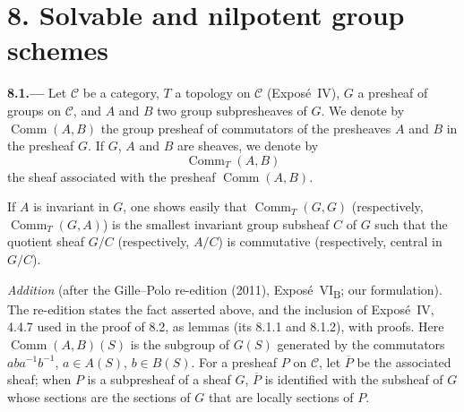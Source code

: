 
\section*{8. Solvable and nilpotent group schemes}
\label{sec:sga3-VIB-8}%

\medskip
{}\label{par:sga3-VIB-8.1}%
\noindent\textbf{8.1.---}
Let \(\mathcal C\) be a category, \(T\) a topology on
\(\mathcal C\) (Expos\'e~IV), \(G\) a presheaf of groups on
\(\mathcal C\), and \(A\) and \(B\) two group subpresheaves of
\(G\). We denote by \(\operatorname{Comm}(A,B)\) the group
presheaf of commutators of the presheaves \(A\) and \(B\) in the
presheaf \(G\). If \(G\), \(A\) and \(B\) are sheaves, we denote
by
\label{form:sga3-VIB-8.1-CommT}%
\[
  \operatorname{Comm}_T(A,B)
\]
the sheaf associated with the presheaf
\(\operatorname{Comm}(A,B)\).

If \(A\) is invariant in \(G\), one shows easily that
\(\operatorname{Comm}_T(G,G)\) \textup{(}respectively,
\(\operatorname{Comm}_T(G,A)\)\textup{)} is the smallest invariant
group subsheaf \(C\) of \(G\) such that the quotient sheaf
\(G/C\) \textup{(}respectively, \(A/C\)\textup{)} is commutative
\textup{(}respectively, central in \(G/C\)\textup{)}.

\medskip\noindent
\emph{Addition} (after the Gille--Polo re-edition (2011), Exposé~VI\textsubscript{B}; our
formulation). The re-edition states the fact asserted above, and the inclusion of Exposé~IV, 4.4.7 used in
the proof of 8.2, as lemmas (its 8.1.1 and 8.1.2), with proofs. Here \(\operatorname{Comm}(A,B)(S)\) is the
subgroup of \(G(S)\) generated by the commutators \(aba^{-1}b^{-1}\), \(a\in A(S)\), \(b\in B(S)\). For a
presheaf \(P\) on \(\mathcal C\), let \(\overline P\) be the associated sheaf; when \(P\) is a subpresheaf of a
sheaf \(G\), \(\overline P\) is identified with the subsheaf of \(G\) whose sections are the sections of
\(G\) that are locally sections of \(P\).

